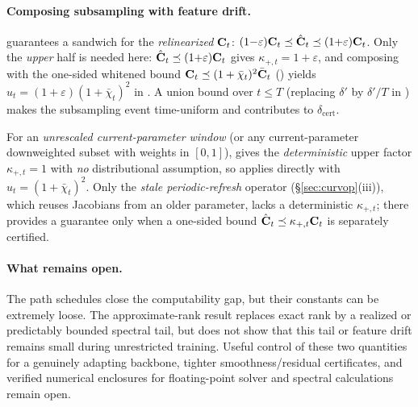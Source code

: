 \paragraph{Composing subsampling with feature drift.}
 guarantees a sandwich for the \emph{relinearized}
$\mathbf{C}_t$: $(1{-}\varepsilon)\mathbf{C}_t\preceq\hat{\mathbf{C}}_t\preceq(1{+}\varepsilon)\mathbf{C}_t$.
Only the \emph{upper} half is needed here: $\hat{\mathbf{C}}_t\preceq(1{+}\varepsilon)\mathbf{C}_t$
gives $\kappa_{+,t}=1+\varepsilon$, and composing with the one-sided
whitened bound $\mathbf{C}_t\preceq(1+\bar\chi_t)^2\bar{\mathbf{C}}_t$ ()
yields $u_t=(1+\varepsilon)(1+\bar\chi_t)^2$ in
.  A union bound over $t\le T$ (replacing
$\delta'$ by $\delta'/T$ in ) makes the subsampling
event time-uniform and contributes to $\delta_{\mathrm{cert}}$.

For an \emph{unrescaled current-parameter window} (or any current-parameter
downweighted subset with weights in $[0,1]$),  gives the
\emph{deterministic} upper factor $\kappa_{+,t}=1$ with \emph{no} distributional
assumption, so  applies directly with
$u_t=(1+\bar\chi_t)^2$.  Only the \emph{stale periodic-refresh} operator
(\S\ref{sec:curvop}(iii)), which reuses Jacobians from an older parameter, lacks
a deterministic $\kappa_{+,t}$; there  provides a
guarantee only when a one-sided bound $\hat{\mathbf{C}}_t\preceq\kappa_{+,t}\mathbf{C}_t$ is
separately certified.

\paragraph{What remains open.}
The path schedules close the computability gap, but their constants can be
extremely loose.  The approximate-rank result replaces exact rank by a realized
or predictably bounded spectral tail, but does not show that this tail or feature
drift remains small during unrestricted training.  Useful control of these two
quantities for a genuinely adapting backbone, tighter smoothness/residual
certificates, and verified numerical enclosures for floating-point solver and
spectral calculations remain open.
